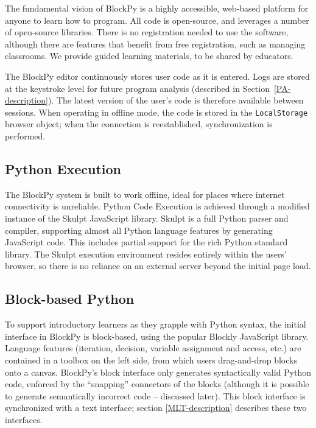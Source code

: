 \documentclass[10pt, conference, compsocconf]{IEEEtran}
\begin{document}
The fundamental vision of BlockPy is a highly accessible, web-based platform for anyone to learn how to program.
All code is open-source, and leverages a number of open-source libraries.
There is no registration needed to use the software, although there are features that benefit from free registration, such as managing classrooms.
We provide guided learning materials, to be shared by educators.

The BlockPy editor continuously stores user code as it is entered.
Logs are stored at the keystroke level for future program analysis (described in Section~\ref{PA-description}).
The latest version of the user's code is therefore available between sessions.
When operating in offline mode, the code is stored in the \texttt{LocalStorage} browser object; when the connection is reestablished, synchronization is performed.

\subsection{Python Execution}

The BlockPy system is built to work offline, ideal for places where internet connectivity is unreliable.
Python Code Execution is achieved through a modified instance of the Skulpt JavaScript library.
Skulpt is a full Python parser and compiler, supporting almost all Python language features by generating JavaScript code.
This includes partial support for the rich Python standard library.
The Skulpt execution environment resides entirely within the users' browser, so there is no reliance on an external server beyond the initial page load.

\subsection{Block-based Python}

To support introductory learners as they grapple with Python syntax, the initial interface in BlockPy is block-based, using the popular Blockly JavaScript library.
Language features (iteration, decision, variable assignment and access, etc.) are contained in a toolbox on the left side, from which users drag-and-drop blocks onto a canvas.
BlockPy's block interface only generates syntactically valid Python code, enforced by the ``snapping'' connectors of the blocks (although it is possible to generate semantically incorrect code -- discussed later).
This block interface is synchronized with a text interface; section \ref{MLT-description} describes these two interfaces.
\end{document}
